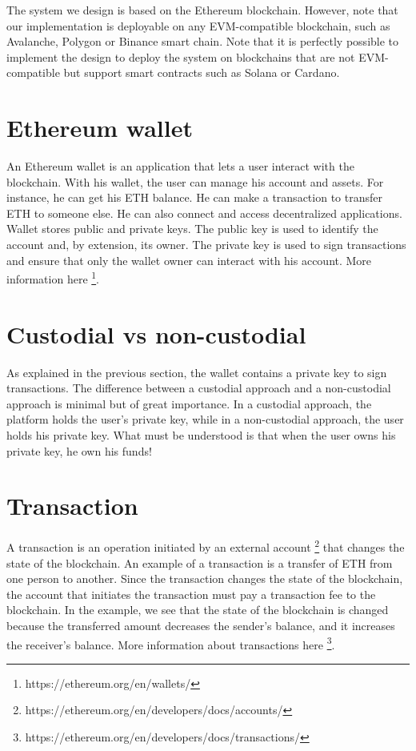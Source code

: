 \documentclass[a4paper,11pt,oneside]{report}
\begin{document}
The system we design is based on the Ethereum blockchain. However, note that our implementation is deployable on any EVM-compatible blockchain, such as Avalanche, Polygon or Binance smart chain. Note that it is perfectly possible to implement the design to deploy the system on blockchains that are not EVM-compatible but support smart contracts such as Solana or Cardano.

\section{Ethereum wallet}
An Ethereum wallet is an application that lets a user interact with the blockchain. With his wallet, the user can manage his account and assets. For instance, he can get his ETH balance. He can make a transaction to transfer ETH to someone else. He can also connect and access decentralized applications. Wallet stores public and private keys. The public key is used to identify the account and, by extension, its owner. The private key is used to sign transactions and ensure that only the wallet owner can interact with his account. More information here \footnote{https://ethereum.org/en/wallets/}.

\section{Custodial vs non-custodial}
As explained in the previous section, the wallet contains a private key to sign transactions. The difference between a custodial approach and a non-custodial approach is minimal but of great importance. In a custodial approach, the platform holds the user's private key, while in a non-custodial approach, the user holds his private key. What must be understood is that when the user owns his private key, he own his funds!

\section{Transaction}
A transaction is an operation initiated by an external account \footnote{https://ethereum.org/en/developers/docs/accounts/} that changes the state of the blockchain. An example of a transaction is a transfer of ETH from one person to another. Since the transaction changes the state of the blockchain, the account that initiates the transaction must pay a transaction fee to the blockchain. In the example, we see that the state of the blockchain is changed because the transferred amount decreases the sender's balance, and it increases the receiver's balance. More information about transactions here \footnote{https://ethereum.org/en/developers/docs/transactions/}.
\end{document}
